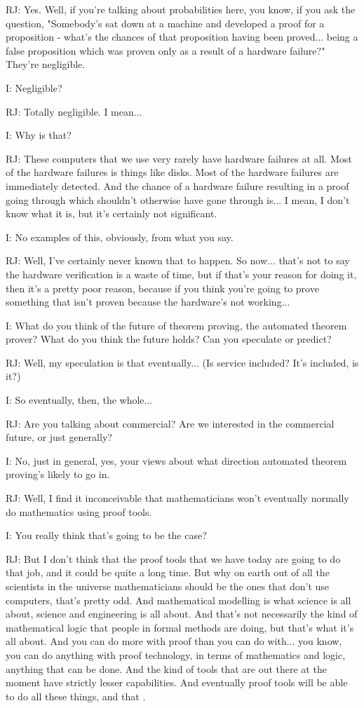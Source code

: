 \documentclass[10pt,titlepage]{book}
\begin{document}
RJ: Yes. Well, if you're talking about probabilities here, you know, if you ask the question, "Somebody's sat down at a machine and developed a proof for a proposition - what's the chances of that proposition having been proved... being a false proposition which was proven only as a result of a hardware failure?" They're negligible.

I: Negligible?

RJ: Totally negligible. I mean...

I: Why is that?

RJ: These computers that we use very rarely have hardware failures at all. Most of the hardware failures is things like disks. Most of the hardware failures are immediately detected. And the chance of a hardware failure resulting in a proof going through which shouldn't otherwise have gone through is... I mean, I don't know what it is, but it's certainly not significant.

I: No examples of this, obviously, from what you say.

RJ: Well, I've certainly never known that to happen. So now... that's not to say the hardware verification is a waste of time, but if that's your reason for doing it, then it's a pretty poor reason, because if you think you're going to prove something that isn't proven because the hardware's not working...

I: What do you think of the future of theorem proving, the automated theorem prover? What do you think the future holds? Can you speculate or predict?

RJ: Well, my speculation is that eventually... (Is service included? It's included, is it?)

I: So eventually, then, the whole...

RJ: Are you talking about commercial? Are we interested in the commercial future, or just generally?

I: No, just in general, yes, your views about what direction automated theorem proving's likely to go in.

RJ: Well, I find it inconceivable that mathematicians won't eventually normally do mathematics using proof tools.

I: You really think that's going to be the case?

RJ: But I don't think that the proof tools that we have today are going to do that job, and it could be quite a long time. But why on earth out of all the scientists in the universe mathematicians should be the ones that don't use computers, that's pretty odd. And mathematical modelling is what science is all about, science and engineering is all about. And that's not necessarily the kind of mathematical logic that people in formal methods are doing, but that's what it's all about. And you can do more with proof than you can do with... you know, you can do anything with proof technology, in terms of mathematics and logic, anything that can be done. And the kind of tools that are out there at the moment have strictly lesser capabilities. And eventually proof tools will be able to do all these things, and that 	.
\end{document}
